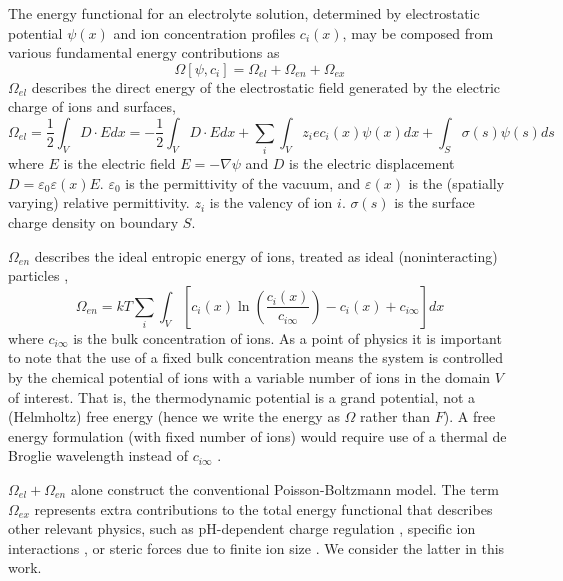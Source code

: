 The energy functional for an electrolyte solution, determined by
electrostatic potential $\psi(x)$ and ion concentration profiles
$c_i(x)$, may be composed from various fundamental energy
contributions as
\begin{equation}
    \Omega[\psi, c_i] = \Omega_{el} + \Omega_{en} +  \Omega_{ex}
\end{equation}
$\Omega_{el}$ describes the direct energy of the electrostatic field generated by the electric charge of ions and surfaces, \cite{Jackson}
\begin{equation}
  \Omega_{el}  =\frac{1}{2} \int_{V}D \cdot E dx
  = -\frac{1}{2} \int_{V}D \cdot E dx + \sum_i \int_V z_i e c_i(x) \psi(x) dx
  + \int_{S} \sigma(s) \psi(s) ds
\end{equation}
where $E$ is the electric field $E=-\nabla\psi$ and $D$ is the
electric displacement $D=\varepsilon_0
\varepsilon(x)E$. $\varepsilon_0$ is the permittivity of the vacuum,
and $\varepsilon(x)$ is the (spatially varying) relative
permittivity. $z_i$ is the valency of ion $i$.  $\sigma(s)$ is the
surface charge density on boundary $S$.

$\Omega_{en}$ describes the ideal entropic energy of ions, treated as ideal (noninteracting) particles \cite{GrayStiles2018,DagmawiParsons2024},
\begin{equation}
    \Omega_{en} = kT \sum_{i} \int_{V} \left[ c_i(x) \ln \left(\frac{c_i(x)}{c_{i\infty}} \right) - c_{i}(x) + c_{i\infty} \right] dx 
\end{equation}
where $c_{i\infty}$ is the bulk concentration of ions. As a point of
physics it is important to note that the use of a fixed bulk
concentration means the system is controlled by the chemical potential
of ions with a variable number of ions in the domain $V$ of interest.
That is, the thermodynamic potential is a grand potential, not a
(Helmholtz) free energy (hence we write the energy as $\Omega$ rather
than $F$). A free energy formulation (with fixed number of ions) would
require use of a thermal de Broglie wavelength instead of
$c_{i\infty}$ \cite{GrayStiles2018}.

$\Omega_{el} + \Omega_{en}$ alone construct the conventional
Poisson-Boltzmann model. The term $\Omega_{ex}$ represents extra
contributions to the total energy functional that describes other
relevant physics, such as pH-dependent charge regulation
\cite{ParsonsSalis2019}, specific ion interactions
\cite{ParsonsCarucciSalis2022}, or steric forces due to finite ion
size \cite{LopezGarciaHornoGrosse2018}. We consider the latter in this
work.

